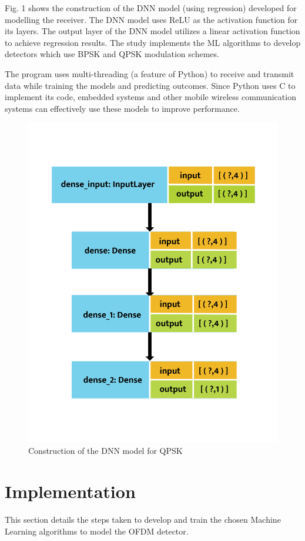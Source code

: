 \documentclass[conference]{IEEEtran}
\begin{document}
Fig. 1 shows the construction of the DNN model (using regression) developed for modelling the receiver. The DNN model uses ReLU as the activation function for its layers. The output layer of the DNN model utilizes a linear activation function to achieve regression results. The study implements the ML algorithms to develop detectors which use BPSK and QPSK modulation schemes. 

The program uses multi-threading (a feature of Python) to receive and transmit data while training the models and predicting outcomes. Since Python uses C to implement its code, embedded systems and other mobile wireless communication systems can effectively use these models to improve performance.

\begin{figure}[htpb]
\centerline{\includegraphics[scale = 0.45]{model_plot_new-01.png}}
\caption{Construction of the DNN model for QPSK}
\label{dnn_model_plot}
\end{figure}


\section{Implementation}
This section details the steps taken to develop and train the chosen Machine Learning algorithms to model the OFDM detector.
\end{document}
